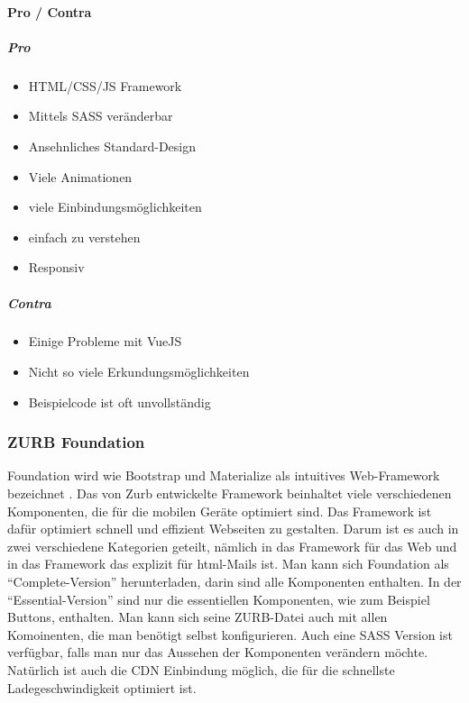 		\paragraph{Pro / Contra}
		\subparagraph{Pro}
		\begin{itemize}
			\item HTML/CSS/JS Framework
			\item Mittels SASS veränderbar
			\item Ansehnliches Standard-Design 
			\item Viele Animationen
			\item viele Einbindungsmöglichkeiten
			\item einfach zu verstehen
			\item Responsiv
		\end{itemize}
		\subparagraph{Contra}
		\begin{itemize}
			\item Einige Probleme mit VueJS
			\item Nicht so viele Erkundungsmöglichkeiten
			\item Beispielcode ist oft unvollständig
		\end{itemize}
	
		\subsubsection{ZURB Foundation}
		Foundation wird wie Bootstrap und Materialize als intuitives Web-Framework bezeichnet \cite{foundation-intro}. Das von Zurb entwickelte Framework beinhaltet viele verschiedenen Komponenten, die für die mobilen Geräte optimiert sind. Das Framework ist dafür optimiert schnell und effizient Webseiten zu gestalten. Darum ist es auch in zwei verschiedene Kategorien geteilt, nämlich in das Framework für das Web und in das Framework das explizit für html-Mails ist. Man kann sich Foundation als \enquote{Complete-Version} herunterladen, darin sind alle Komponenten enthalten. In der \enquote{Essential-Version} sind nur die essentiellen Komponenten, wie zum Beispiel Buttons, enthalten. Man kann sich seine ZURB-Datei auch mit allen Komoinenten, die man benötigt selbst konfigurieren. Auch eine SASS Version ist verfügbar, falls man nur das Aussehen der Komponenten verändern möchte. Natürlich ist auch die CDN Einbindung möglich, die für die schnellste Ladegeschwindigkeit optimiert ist.
